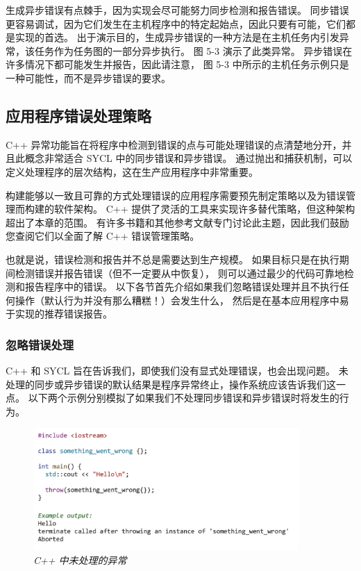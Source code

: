 生成异步错误有点棘手，因为实现会尽可能努力同步检测和报告错误。 
同步错误更容易调试，因为它们发生在主机程序中的特定起始点，因此只要有可能，它们都是实现的首选。 
出于演示目的，生成异步错误的一种方法是在主机任务内引发异常，该任务作为任务图的一部分异步执行。 
图 5-3 演示了此类异常。 异步错误在许多情况下都可能发生并报告，因此请注意，
图 5-3 中所示的主机任务示例只是一种可能性，而不是异步错误的要求。

\subsection{应用程序错误处理策略}
C++ 异常功能旨在将程序中检测到错误的点与可能处理错误的点清楚地分开，并且此概念非常适合 SYCL 中的同步错误和异步错误。 
通过抛出和捕获机制，可以定义处理程序的层次结构，这在生产应用程序中非常重要。

构建能够以一致且可靠的方式处理错误的应用程序需要预先制定策略以及为错误管理而构建的软件架构。 
C++ 提供了灵活的工具来实现许多替代策略，但这种架构超出了本章的范围。 
有许多书籍和其他参考文献专门讨论此主题，因此我们鼓励您查阅它们以全面了解 C++ 错误管理策略。

也就是说，错误检测和报告并不总是需要达到生产规模。 如果目标只是在执行期间检测错误并报告错误（但不一定要从中恢复），
则可以通过最少的代码可靠地检测和报告程序中的错误。 
以下各节首先介绍如果我们忽略错误处理并且不执行任何操作（默认行为并没有那么糟糕！）会发生什么，
然后是在基本应用程序中易于实现的推荐错误报告。

\subsubsection{忽略错误处理}
C++ 和 SYCL 旨在告诉我们，即使我们没有显式处理错误，也会出现问题。 
未处理的同步或异步错误的默认结果是程序异常终止，操作系统应该告诉我们这一点。 
以下两个示例分别模拟了如果我们不处理同步错误和异步错误时将发生的行为。

\begin{figure}[H]
	\centering
	\includegraphics[width=0.9\textwidth]{figs/F5.4.png}
	\caption{\textit{C++ 中未处理的异常}}
\end{figure}

